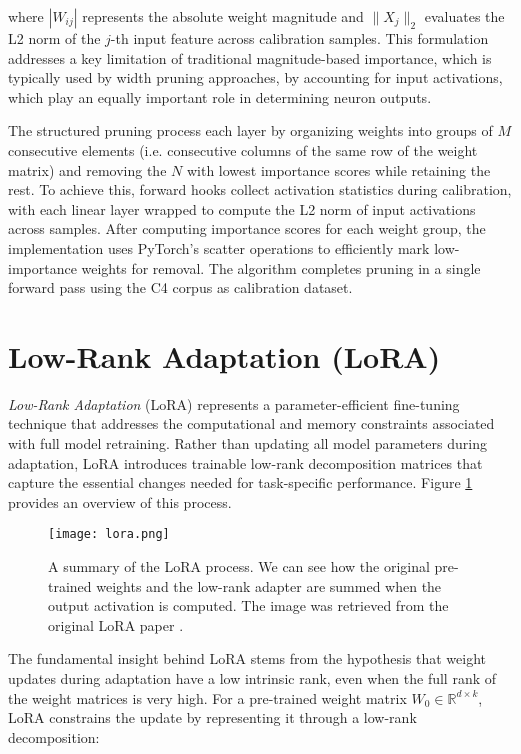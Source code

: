 where $|W_{ij}|$ represents the absolute weight magnitude and $\|X_j\|_2$ evaluates the L2 norm of the $j$-th input feature across calibration samples. This formulation addresses a key limitation of traditional magnitude-based importance, which is typically used by width pruning approaches, by accounting for input activations, which play an equally important role in determining neuron outputs.

The structured pruning process each layer by organizing weights into groups of $M$ consecutive elements (i.e. consecutive columns of the same row of the weight matrix) and removing the $N$ with lowest importance scores while retaining the rest. To achieve this, forward hooks collect activation statistics during calibration, with each linear layer wrapped to compute the L2 norm of input activations across samples. After computing importance scores for each weight group, the implementation uses PyTorch's scatter operations to efficiently mark low-importance weights for removal. The algorithm completes pruning in a single forward pass using the C4 corpus \cite{c4} as calibration dataset.

\section{Low-Rank Adaptation (LoRA)} \label{lora}

\textit{Low-Rank Adaptation} (LoRA) \cite{lora} represents a parameter-efficient fine-tuning technique that addresses the computational and memory constraints associated with full model retraining. Rather than updating all model parameters during adaptation, LoRA introduces trainable low-rank decomposition matrices that capture the essential changes needed for task-specific performance. Figure \ref{fig:lora} provides an overview of this process.

\begin{figure}[htbp]
    \centering
    \texttt{[image: lora.png]}
    \caption[LoRA Overview]{A summary of the LoRA process. We can see how the original pre-trained weights and the low-rank adapter are summed when the output activation is computed. The image was retrieved from the original LoRA paper \cite{lora}.}
    \label{fig:lora}
\end{figure}

The fundamental insight behind LoRA stems from the hypothesis that weight updates during adaptation have a low intrinsic rank, even when the full rank of the weight matrices is very high. For a pre-trained weight matrix $W_0 \in \mathbb{R}^{d \times k}$, LoRA constrains the update by representing it through a low-rank decomposition:


